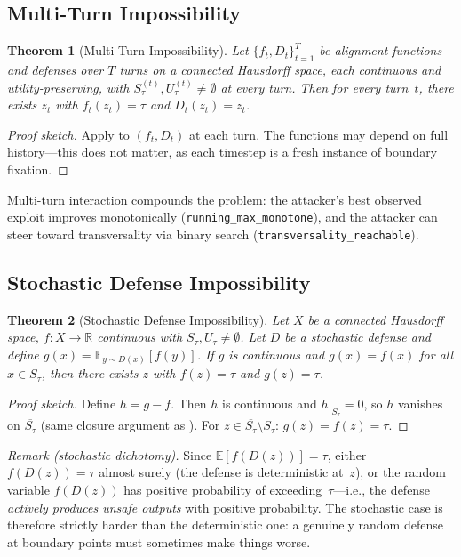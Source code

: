 \documentclass[11pt]{article}
\newtheorem{theorem}{Theorem}[section]
\newcommand{\R}{\mathbb{R}}
\newcommand{\cl}[1]{\overline{#1}}
\begin{document}
\subsection{Multi-Turn Impossibility}

\begin{theorem}[Multi-Turn Impossibility]
\label{thm:multi-turn}
Let $\{f_t, D_t\}_{t=1}^T$ be alignment functions and defenses over
$T$ turns on a connected Hausdorff space, each continuous and
utility-preserving, with $S_\tau^{(t)}, U_\tau^{(t)} \neq \emptyset$
at every turn. Then for every turn~$t$, there exists $z_t$ with
$f_t(z_t) = \tau$ and $D_t(z_t) = z_t$.
\end{theorem}

\begin{proof}[Proof sketch]
Apply  to $(f_t, D_t)$ at each turn. The functions may
depend on full history---this does not matter, as each timestep is a
fresh instance of boundary fixation.
\end{proof}

Multi-turn interaction compounds the problem: the attacker's best
observed exploit improves monotonically
(\texttt{running\_max\_monotone}), and the attacker can steer toward
transversality via binary search (\texttt{transversality\_reachable}).

\subsection{Stochastic Defense Impossibility}

\begin{theorem}[Stochastic Defense Impossibility]
\label{thm:stochastic}
Let $X$ be a connected Hausdorff space, $f\colon X \to \R$ continuous
with $S_\tau, U_\tau \neq \emptyset$. Let $D$ be a stochastic defense
and define $g(x) = \mathbb{E}_{y \sim D(x)}[f(y)]$. If $g$ is
continuous and $g(x) = f(x)$ for all $x \in S_\tau$, then there
exists $z$ with $f(z) = \tau$ and $g(z) = \tau$.
\end{theorem}

\begin{proof}[Proof sketch]
Define $h = g - f$. Then $h$ is continuous and $h|_{S_\tau} = 0$,
so $h$ vanishes on $\cl{S_\tau}$ (same closure argument as
). For
$z \in \cl{S_\tau} \setminus S_\tau$: $g(z) = f(z) = \tau$.
\end{proof}

\noindent\textit{Remark (stochastic dichotomy).}
Since $\mathbb{E}[f(D(z))] = \tau$, either $f(D(z)) = \tau$ almost
surely (the defense is deterministic at~$z$), or the random variable
$f(D(z))$ has positive probability of exceeding~$\tau$---i.e., the
defense \emph{actively produces unsafe outputs} with positive
probability. The stochastic case is therefore strictly harder than
the deterministic one: a genuinely random defense at boundary points
must sometimes make things worse.
\end{document}

